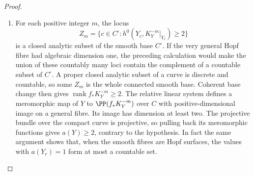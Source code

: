 \begin{proof}
\begin{enumerate}[label=\arabic*.,leftmargin=*]
\item For each positive integer $m$, the locus
\[
Z_m=\{c\in C^\circ:
 h^0(Y_c,K_Y^{-m}|_{Y_c})\ge2\}
\]
is a closed analytic subset of the smooth base $C^\circ$.
If the very general Hopf fibre had algebraic dimension one,
the preceding calculation would make the union of these
countably many loci contain the complement of a countable
subset of $C^\circ$. A proper closed analytic subset of a
curve is discrete and countable, so some $Z_m$ is the whole
connected smooth base. Coherent base change then gives
$\operatorname{rank}f_*K_Y^{-m}\ge2$.
The relative linear system defines a meromorphic map of $Y$
to $\PP(f_*K_Y^{-m})$ over $C$ with positive-dimensional image
on a general fibre. Its image has dimension at least two.
The projective bundle over the compact curve is projective,
so pulling back its meromorphic functions gives $a(Y)\ge2$,
contrary to the hypothesis. In fact the same argument shows
that, when the smooth fibres are Hopf surfaces, the values with
$a(Y_c)=1$ form at most a countable set.

\end{enumerate}
\end{proof}